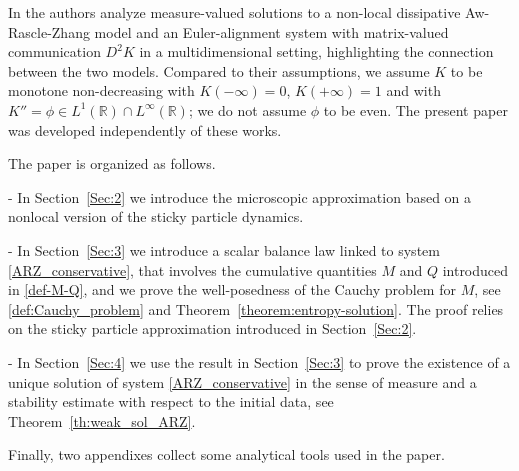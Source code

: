 \documentclass[11pt,a4paper,oneside]{amsart}
\newcommand\R{\mathbb{R}}
\begin{document}
{In \cite{CPSZ2024,WZ2025} the authors analyze measure-valued solutions to a non-local dissipative Aw-Rascle-Zhang model and an Euler-alignment system with matrix-valued communication $D^2K$ in a multidimensional setting, highlighting the connection between the two models. Compared to their assumptions, we assume $K$ to be monotone non-decreasing with $K(-\infty)=0$,  $K(+\infty)=1$ and with $K''=\phi \in L^1(\R)\cap L^\infty(\R)$; we do not assume $\phi$ to be even.
The present paper was developed independently of these works.}


The paper is organized as follows. 

- In Section~\ref{Sec:2} we introduce the microscopic approximation based on a nonlocal version of the sticky particle dynamics. 

- In Section~\ref{Sec:3} we introduce a scalar balance law linked to system \eqref{ARZ_conservative}, 
that involves the cumulative quantities $M$ and $Q$ introduced in \eqref{def-M-Q}, 
and we prove the well-posedness of the Cauchy problem for $M$, see \eqref{def:Cauchy_problem} and Theorem~\ref{theorem:entropy-solution}. 
The proof relies on the sticky particle approximation introduced in Section~\ref{Sec:2}.

- In Section~\ref{Sec:4} we use the result in Section~\ref{Sec:3} to prove the existence of a unique solution of system \eqref{ARZ_conservative} 
in the sense of measure and a stability estimate with respect to the initial data, see Theorem~\ref{th:weak_sol_ARZ}. 

Finally, two appendixes collect some analytical tools used in the paper.
\end{document}
